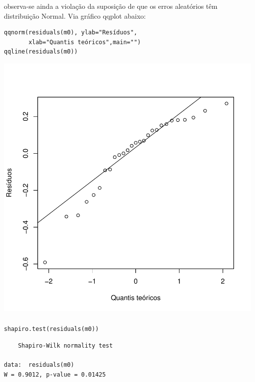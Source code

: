 \documentclass[14pt,aspectratio=1610]{beamer}
\begin{document}
\begin{frame}[fragile]{}
\frametitle{ }
\begin{block}{}
\justifying
observa-se ainda a violação da suposição de que os erros aleatórios têm distribuição
Normal. Via gráfico qqplot abaixo:
\begin{verbatim}
qqnorm(residuals(m0), ylab="Resíduos",
       xlab="Quantis teóricos",main="")
qqline(residuals(m0))    
\end{verbatim}
\end{block}

\vspace{-1cm}
\begin{center}
\includegraphics{Aula4Regressao/Figuras/Aula4-022}
\end{center}

\end{frame}

\begin{frame}[fragile]{}
\frametitle{ }
\begin{block}{}
\begin{verbatim}
shapiro.test(residuals(m0))    
\end{verbatim}
\begin{verbatim}
	Shapiro-Wilk normality test

data:  residuals(m0)
W = 0.9012, p-value = 0.01425    
\end{verbatim}
\end{block}
\end{frame}
\end{document}
